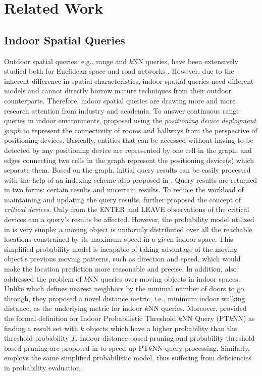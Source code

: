 \documentclass[12pt]{report}
\begin{document}
\part{Related Work}
\label{sec:related-work}
\chapter{Indoor Spatial Queries}
\label{sec:indoor-spatial-queries}
Outdoor spatial queries, e.g., range and \(k\)NN queries, have been
extensively studied both for Euclidean space
\cite{roussopoulos1995-nearest,hjaltason1999-distance} and road
networks \cite{papadias2003-query,samet2008-scalable,lee2012-road}.
However, due to the inherent difference in spatial characteristics,
indoor spatial queries need different models and cannot directly
borrow mature techniques from their outdoor counterparts.
Therefore, indoor spatial queries are drawing more and more
research attention from industry and academia.  To answer
continuous range queries in indoor environments,
\cite{jensen2009-graph} proposed using the \emph{positioning device
deployment graph} to represent the connectivity of rooms and
hallways from the perspective of positioning devices.  Basically,
entities that can be accessed without having to be detected by any
positioning device are represented by one cell in the graph, and
edges connecting two cells in the graph represent the positioning
device(s) which separate them.  Based on the graph, initial query
results can be easily processed with the help of an indexing scheme
also proposed in \cite{yang2009-scalable}.  Query results are
returned in two forms: certain results and uncertain results.  To
reduce the workload of maintaining and updating the query results,
\cite{yang2010-probabilistic} further proposed the concept of
\emph{critical devices}.  Only from the ENTER and LEAVE observations of
the critical devices can a query's results be affected.  However,
the probability model utilized in \cite{yang2010-probabilistic} is
very simple: a moving object is uniformly distributed over all the
reachable locations constrained by its maximum speed in a given
indoor space.  This simplified probability model is incapable of
taking advantage of the moving object's previous moving patterns,
such as direction and speed, which would make the location
prediction more reasonable and precise.  In addition,
\cite{yang2010-probabilistic} also addressed the problem of \(k\)NN
queries over moving objects in indoor spaces.  Unlike
\cite{li2008-lattice} which defines nearest neighbors by the minimal
number of doors to go through, they proposed a novel distance
metric, i.e., minimum indoor walking distance, as the underlying
metric for indoor \(k\)NN queries.  Moreover,
\cite{yang2010-probabilistic} provided the formal definition for
Indoor Probabilistic Threshold \(k\)NN Query (PT\(k\)NN) as finding
a result set with \(k\) objects which have a higher probability
than the threshold probability \(T\).  Indoor distance-based
pruning and probability threshold-based pruning are proposed in
\cite{yang2010-probabilistic} to speed up PT\(k\)NN query processing.
Similarly, \cite{yang2009-scalable} employs the same simplified
probabilistic model, thus suffering from deficiencies in
probability evaluation.
\end{document}
